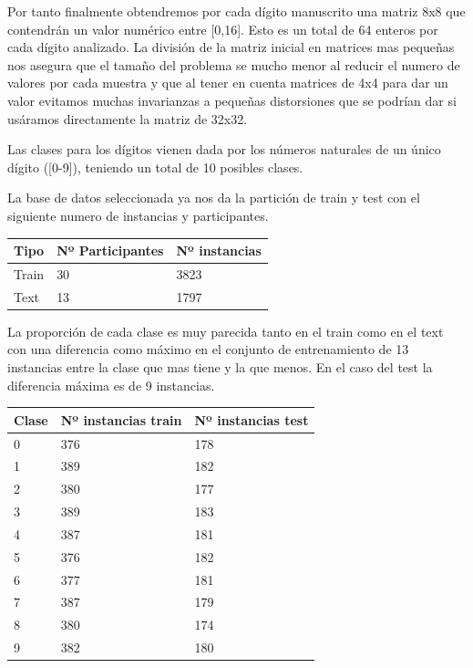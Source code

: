 \documentclass[titlepage]{article}
\begin{document}
	
	 Por tanto finalmente obtendremos por cada dígito manuscrito una matriz 8x8 que contendrán un valor numérico entre [0,16]. Esto es un total de 64 enteros por cada dígito analizado. La división de la matriz inicial en matrices mas pequeñas nos asegura que el tamaño del problema se mucho menor al reducir el numero de valores por cada muestra y que al tener en cuenta matrices de 4x4 para dar un valor evitamos muchas invarianzas a pequeñas distorsiones que se podrían dar si usáramos directamente la matriz de 32x32. 
	
	Las clases para los dígitos vienen dada por los números naturales de un único dígito ([0-9]), teniendo un total de 10 posibles clases.
	
	La base de datos seleccionada ya nos da la partición de train y test con el siguiente numero de instancias y participantes.
	
	\begin{table}[htbp]
		\begin{center}
			\begin{tabular}{|l|l|l|}
				\hline
				Tipo & Nº Participantes & Nº instancias \\
				\hline
				Train & 30 & 3823\\ \hline
				Text & 13 & 1797\\
				 \hline
			\end{tabular}
		\end{center}
	\end{table}

	La proporción de cada clase es muy parecida tanto en el train como en el text con una diferencia como máximo en el conjunto de entrenamiento de 13 instancias entre la clase que mas tiene y la que menos. En el caso del test la diferencia máxima es de 9 instancias. 
	
		\begin{table}[htbp]
		\begin{center}
			\begin{tabular}{|l|l|l|}
				\hline
				Clase & Nº instancias train & Nº instancias test\\
				\hline
				0 & 376 & 178\\ 
				\hline
				1 & 389 & 182\\ 
				\hline
				2 & 380 & 177\\ 
				\hline
				3 & 389 & 183\\ 
				\hline
				4 & 387 & 181\\ 
				\hline
				5 & 376 & 182\\ 
				\hline
				6 & 377 & 181\\ 
				\hline
				7 & 387 & 179\\ 
				\hline
				8 & 380 & 174\\ 
				\hline
				9 & 382 & 180\\ 
				\hline
			\end{tabular}
		\end{center}
	\end{table}
	\newpage
	
\end{document}
